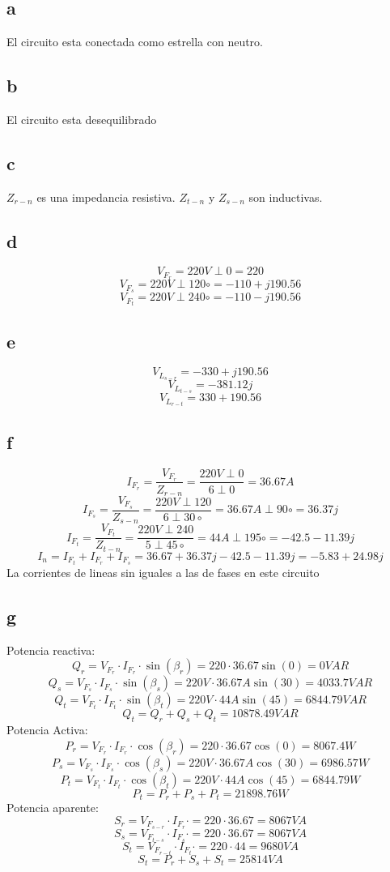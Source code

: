 \documentclass{article}
\begin{document}
\section{}
\subsection{a}
El circuito esta conectada como estrella con neutro.
\subsection{b}
El circuito esta desequilibrado
\subsection{c}
$Z_{r-n}$ es una impedancia resistiva.
$Z_{t-n}$ y $Z_{s-n}$ son inductivas.
\subsection{d}
\[V_F_r=220V\perp0=220\]
\[V_F_s=220V\perp120\circ=-110+j190.56\]
\[V_F_t=220V\perp240\circ=-110-j190.56\]
\subsection{e}
\[V_L_{s-r}=-330+j190.56\]
\[V_L_{t-s}=-381.12j\]
\[V_L_{r-t}=330+190.56\]
\subsection{f}
\[I_F_r=\frac{V_F_r}{Z_{r-n}}=\frac{220V\perp0}{6\perp0}=36.67A\]
\[I_F_s=\frac{V_F_s}{Z_{s-n}}=\frac{220V\perp120}{6\perp30\circ}=36.67A\perp90\circ=36.37j\]
\[I_F_t=\frac{V_F_t}{Z_{t-n}}=\frac{220V\perp240}{5\perp45\circ}=44A\perp195\circ=-42.5-11.39j\]
\[I_n=I_F_t+I_F_r+I_F_s=36.67+36.37j-42.5-11.39j=-5.83+24.98j\]
La corrientes de lineas sin iguales a las de fases en este circuito
\subsection{g}
Potencia reactiva:
\[Q_{r}=V_F_{r}\cdot I_F_{r}\cdot\sin(\beta_{r})= 220\cdot 36.67\sin(0)=0VAR\]
\[Q_{s}=V_F_{s}\cdot I_F_{s}\cdot\sin(\beta_{s})=220V \cdot36.67A\sin(30)=4033.7VAR\]
\[Q_{t}=V_F_{t}\cdot I_F_{t}\cdot\sin(\beta_{t})=220V\cdot44A\sin(45)=6844.79VAR\]
\[Q_t=Q_{r}+Q_{s}+Q_{t}=10878.49VAR\]
Potencia Activa:
\[P_{r}=V_F_{r}\cdot I_F_{r}\cdot\cos(\beta_{r})=220\cdot 36.67\cos(0)=8067.4W\]
\[P_{s}=V_F_{s}\cdot I_F_{s}\cdot\cos(\beta_{s})=220V\cdot36.67A\cos(30)=6986.57W\]
\[P_{t}=V_F_{t}\cdot
I_F_{t}\cdot\cos(\beta_{t})=220V\cdot44A\cos(45)=6844.79W\]
\[P_t=P_{r}+P_{s}+P_{t}=21898.76W\]
Potencia aparente:
\[S_{r}=V_F_{s-r}\cdot I_F_{r}\cdot=220\cdot 36.67=8067VA\]
\[S_{s}=V_F_{t-s}\cdot I_F_{s}\cdot=220\cdot 36.67=8067VA\]
\[S_{t}=V_F_{r-t}\cdot I_F_{t}\cdot=220\cdot 44=9680VA\]
\[S_t=P_{r}+S_{s}+S_{t}=25814VA\]
\end{document}

